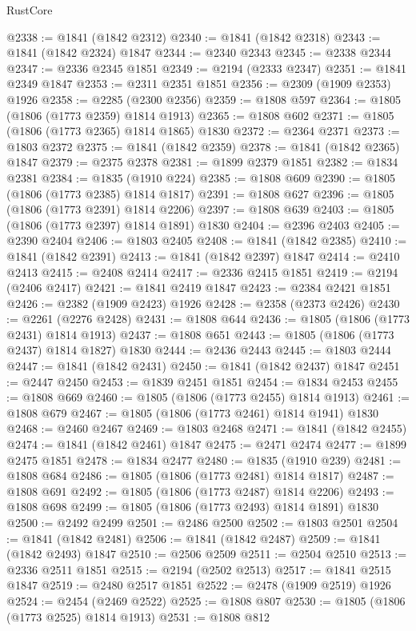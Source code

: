 \begin{lexlean}{RustCore}
\begin{coremodule}
@2338 := @1841 (@1842 @2312)
@2340 := @1841 (@1842 @2318)
@2343 := @1841 (@1842 @2324) @1847
@2344 := @2340 @2343
@2345 := @2338 @2344
@2347 := @2336 @2345 @1851
@2349 := @2194 (@2333 @2347)
@2351 := @1841 @2349 @1847
@2353 := @2311 @2351 @1851
@2356 := @2309 (@1909 @2353) @1926
@2358 := @2285 (@2300 @2356)
@2359 := @1808 @597
@2364 := @1805 (@1806 (@1773 @2359) @1814 @1913)
@2365 := @1808 @602
@2371 := @1805 (@1806 (@1773 @2365) @1814 @1865) @1830
@2372 := @2364 @2371
@2373 := @1803 @2372
@2375 := @1841 (@1842 @2359)
@2378 := @1841 (@1842 @2365) @1847
@2379 := @2375 @2378
@2381 := @1899 @2379 @1851
@2382 := @1834 @2381
@2384 := @1835 (@1910 @224)
@2385 := @1808 @609
@2390 := @1805 (@1806 (@1773 @2385) @1814 @1817)
@2391 := @1808 @627
@2396 := @1805 (@1806 (@1773 @2391) @1814 @2206)
@2397 := @1808 @639
@2403 := @1805 (@1806 (@1773 @2397) @1814 @1891) @1830
@2404 := @2396 @2403
@2405 := @2390 @2404
@2406 := @1803 @2405
@2408 := @1841 (@1842 @2385)
@2410 := @1841 (@1842 @2391)
@2413 := @1841 (@1842 @2397) @1847
@2414 := @2410 @2413
@2415 := @2408 @2414
@2417 := @2336 @2415 @1851
@2419 := @2194 (@2406 @2417)
@2421 := @1841 @2419 @1847
@2423 := @2384 @2421 @1851
@2426 := @2382 (@1909 @2423) @1926
@2428 := @2358 (@2373 @2426)
@2430 := @2261 (@2276 @2428)
@2431 := @1808 @644
@2436 := @1805 (@1806 (@1773 @2431) @1814 @1913)
@2437 := @1808 @651
@2443 := @1805 (@1806 (@1773 @2437) @1814 @1827) @1830
@2444 := @2436 @2443
@2445 := @1803 @2444
@2447 := @1841 (@1842 @2431)
@2450 := @1841 (@1842 @2437) @1847
@2451 := @2447 @2450
@2453 := @1839 @2451 @1851
@2454 := @1834 @2453
@2455 := @1808 @669
@2460 := @1805 (@1806 (@1773 @2455) @1814 @1913)
@2461 := @1808 @679
@2467 := @1805 (@1806 (@1773 @2461) @1814 @1941) @1830
@2468 := @2460 @2467
@2469 := @1803 @2468
@2471 := @1841 (@1842 @2455)
@2474 := @1841 (@1842 @2461) @1847
@2475 := @2471 @2474
@2477 := @1899 @2475 @1851
@2478 := @1834 @2477
@2480 := @1835 (@1910 @239)
@2481 := @1808 @684
@2486 := @1805 (@1806 (@1773 @2481) @1814 @1817)
@2487 := @1808 @691
@2492 := @1805 (@1806 (@1773 @2487) @1814 @2206)
@2493 := @1808 @698
@2499 := @1805 (@1806 (@1773 @2493) @1814 @1891) @1830
@2500 := @2492 @2499
@2501 := @2486 @2500
@2502 := @1803 @2501
@2504 := @1841 (@1842 @2481)
@2506 := @1841 (@1842 @2487)
@2509 := @1841 (@1842 @2493) @1847
@2510 := @2506 @2509
@2511 := @2504 @2510
@2513 := @2336 @2511 @1851
@2515 := @2194 (@2502 @2513)
@2517 := @1841 @2515 @1847
@2519 := @2480 @2517 @1851
@2522 := @2478 (@1909 @2519) @1926
@2524 := @2454 (@2469 @2522)
@2525 := @1808 @807
@2530 := @1805 (@1806 (@1773 @2525) @1814 @1913)
@2531 := @1808 @812

\end{coremodule}
\end{lexlean}
